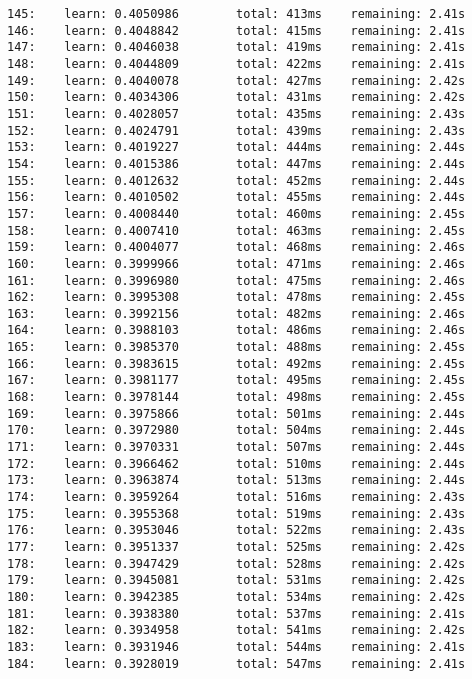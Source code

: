 \documentclass[11pt]{article}
\begin{document}
\begin{Verbatim}[commandchars=\\\{\}]
145:    learn: 0.4050986        total: 413ms    remaining: 2.41s
146:    learn: 0.4048842        total: 415ms    remaining: 2.41s
147:    learn: 0.4046038        total: 419ms    remaining: 2.41s
148:    learn: 0.4044809        total: 422ms    remaining: 2.41s
149:    learn: 0.4040078        total: 427ms    remaining: 2.42s
150:    learn: 0.4034306        total: 431ms    remaining: 2.42s
151:    learn: 0.4028057        total: 435ms    remaining: 2.43s
152:    learn: 0.4024791        total: 439ms    remaining: 2.43s
153:    learn: 0.4019227        total: 444ms    remaining: 2.44s
154:    learn: 0.4015386        total: 447ms    remaining: 2.44s
155:    learn: 0.4012632        total: 452ms    remaining: 2.44s
156:    learn: 0.4010502        total: 455ms    remaining: 2.44s
157:    learn: 0.4008440        total: 460ms    remaining: 2.45s
158:    learn: 0.4007410        total: 463ms    remaining: 2.45s
159:    learn: 0.4004077        total: 468ms    remaining: 2.46s
160:    learn: 0.3999966        total: 471ms    remaining: 2.46s
161:    learn: 0.3996980        total: 475ms    remaining: 2.46s
162:    learn: 0.3995308        total: 478ms    remaining: 2.45s
163:    learn: 0.3992156        total: 482ms    remaining: 2.46s
164:    learn: 0.3988103        total: 486ms    remaining: 2.46s
165:    learn: 0.3985370        total: 488ms    remaining: 2.45s
166:    learn: 0.3983615        total: 492ms    remaining: 2.45s
167:    learn: 0.3981177        total: 495ms    remaining: 2.45s
168:    learn: 0.3978144        total: 498ms    remaining: 2.45s
169:    learn: 0.3975866        total: 501ms    remaining: 2.44s
170:    learn: 0.3972980        total: 504ms    remaining: 2.44s
171:    learn: 0.3970331        total: 507ms    remaining: 2.44s
172:    learn: 0.3966462        total: 510ms    remaining: 2.44s
173:    learn: 0.3963874        total: 513ms    remaining: 2.44s
174:    learn: 0.3959264        total: 516ms    remaining: 2.43s
175:    learn: 0.3955368        total: 519ms    remaining: 2.43s
176:    learn: 0.3953046        total: 522ms    remaining: 2.43s
177:    learn: 0.3951337        total: 525ms    remaining: 2.42s
178:    learn: 0.3947429        total: 528ms    remaining: 2.42s
179:    learn: 0.3945081        total: 531ms    remaining: 2.42s
180:    learn: 0.3942385        total: 534ms    remaining: 2.42s
181:    learn: 0.3938380        total: 537ms    remaining: 2.41s
182:    learn: 0.3934958        total: 541ms    remaining: 2.42s
183:    learn: 0.3931946        total: 544ms    remaining: 2.41s
184:    learn: 0.3928019        total: 547ms    remaining: 2.41s

\end{Verbatim}
\end{document}
